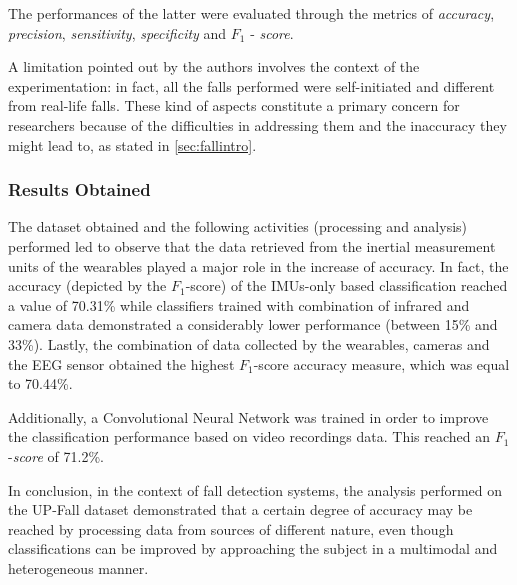 The performances of the latter were evaluated through the metrics of \textit{accuracy}, \textit{precision}, \textit{sensitivity}, \textit{specificity} and $F_1$ - \textit{score}.

A limitation pointed out by the authors \cite{umafall} involves the context of the experimentation: in fact, all the falls performed were self-initiated and different from real-life falls. These kind of aspects constitute a primary concern for researchers because of the difficulties in addressing them and the inaccuracy they might lead to, as stated in  \ref{sec:fallintro}.

\subsubsection{Results Obtained}\label{subsubsec:upfall-results}

The dataset obtained and the following activities (processing and analysis) performed led to observe that the data retrieved from the inertial measurement units of the wearables played a major role in the increase of accuracy. In fact, the accuracy (depicted by the $F_1$-score) of the IMUs-only based classification reached a value of 70.31\% while classifiers trained with combination of infrared and camera data demonstrated a considerably lower performance (between 15\% and 33\%). Lastly, the combination of data collected by the wearables, cameras and the EEG sensor obtained the highest $F_1$-score accuracy measure, which was equal to 70.44\%. 

Additionally, a Convolutional Neural Network was trained in order to improve the classification performance based on video recordings data. This reached an $F_1$-\textit{score} of 71.2\%.

In conclusion, in the context of fall detection systems, the analysis performed on the UP-Fall dataset demonstrated that a certain degree of accuracy may be reached by processing data from sources of different nature, even though classifications can be improved by approaching the subject in a multimodal and heterogeneous manner.

